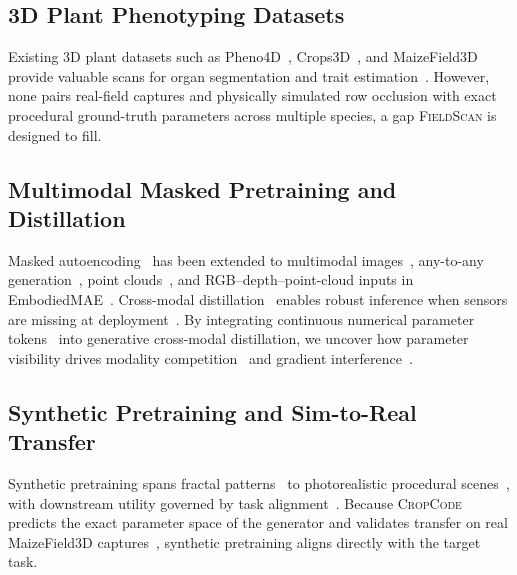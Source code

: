 \documentclass[10pt,twocolumn,letterpaper]{article}
\newcommand{\method}{\textsc{CropCode}}
\newcommand{\dataset}{\textsc{FieldScan}}
\begin{document}
\subsection{3D Plant Phenotyping Datasets}
Existing 3D plant datasets such as Pheno4D~\citep{schunck2021pheno4d}, Crops3D~\citep{crops3d2024}, and MaizeField3D~\citep{maizefield3d2025} provide valuable scans for organ segmentation and trait estimation~\citep{qi2017pointnet,qi2017pointnetpp,arshad2024nerf_field}. However, none pairs real-field captures and physically simulated row occlusion with exact procedural ground-truth parameters across multiple species, a gap \dataset{} is designed to fill.

\subsection{Multimodal Masked Pretraining and Distillation}
Masked autoencoding~\citep{he2022mae} has been extended to multimodal images~\citep{bachmann2022multimae}, any-to-any generation~\citep{mizrahi2023fourm,bachmann2024fourm21}, point clouds~\citep{pang2022pointmae}, and RGB--depth--point-cloud inputs in EmbodiedMAE~\citep{dong2025embodiedmae}. Cross-modal distillation~\citep{hinton2015distillation} enables robust inference when sensors are missing at deployment~\citep{wang2024robustmissing}. By integrating continuous numerical parameter tokens~\citep{golkar2023xval} into generative cross-modal distillation, we uncover how parameter visibility drives modality competition~\citep{peng2022ogm} and gradient interference~\citep{yu2020pcgrad,chen2018gradnorm}.

\subsection{Synthetic Pretraining and Sim-to-Real Transfer}
Synthetic pretraining spans fractal patterns~\citep{kataoka2020fractaldb} to photorealistic procedural scenes~\citep{raistrick2023infinigen,greff2022kubric,tobin2017domainrand}, with downstream utility governed by task alignment~\citep{fan2023intriguing,alemohammad2023mad}. Because \method{} predicts the exact parameter space of the generator and validates transfer on real MaizeField3D captures~\citep{maizefield3d2025}, synthetic pretraining aligns directly with the target task.

\end{document}
